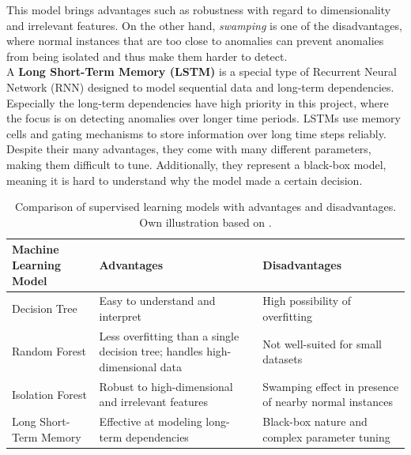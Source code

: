 This model brings advantages such as robustness with regard to dimensionality and irrelevant features. On the other hand, \textit{swamping} is one of the disadvantages, where normal instances that are too close to anomalies can prevent anomalies from being isolated and thus make them harder to detect.\cite{iForest}\\
A \textbf{Long Short-Term Memory (LSTM)} is a special type of Recurrent Neural Network (RNN) designed to model sequential data and long-term dependencies. Especially the long-term dependencies have high priority in this project, where the focus is on detecting anomalies over longer time periods. LSTMs use memory cells and gating mechanisms to store information over long time steps reliably. Despite their many advantages, they come with many different parameters, making them difficult to tune. Additionally, they represent a black-box model, meaning it is hard to understand why the model made a certain decision.\cite{LSTM_understanding}\\
\begin{table}[H]
	\centering
	\begin{tabular}{|l|p{4cm}|p{4cm}|}
		\hline
		\textbf{Machine Learning Model} & \textbf{Advantages} & \textbf{Disadvantages} \\
		\hline
		Decision Tree & Easy to understand and interpret & High possibility of overfitting \\
		\hline
		Random Forest & Less overfitting than a single decision tree; handles high-dimensional data & Not well-suited for small datasets \\
		\hline
		Isolation Forest & Robust to high-dimensional and irrelevant features & Swamping effect in presence of nearby normal instances \\
		\hline
        Long Short-Term Memory & Effective at modeling long-term dependencies & Black-box nature and complex parameter tuning \\
		\hline
	\end{tabular}
	\caption{Comparison of supervised learning models with advantages and disadvantages. Own illustration based on \cite{decision_tree_explain}\cite{breiman2001randomforests}\cite{iForest}\cite{LSTM_understanding}.}
    \label{tab:supervised_learning_models}
\end{table}